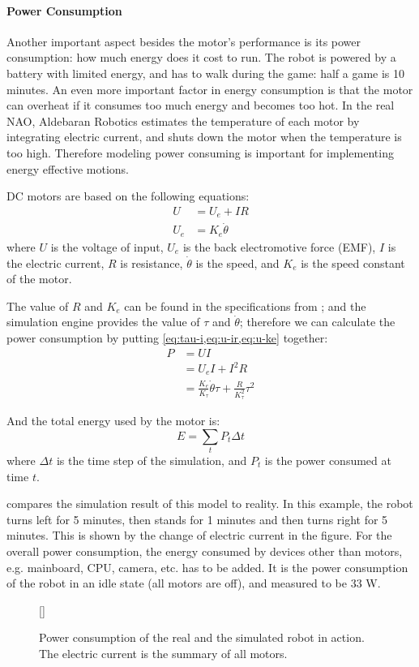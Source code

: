 \documentclass{llncs}
\newcommand{\inputtikz}[1]
{
  \StrSubstitute{#1}{/}{.}[\fn]
  \scancs{\filename}{\fn}
  \tikzsetfigurename{\filename}
  
}
\begin{document}
\paragraph{Power Consumption}
Another important aspect besides the motor's performance is its
power consumption: how much energy does it cost to run.
The robot is powered by a battery with limited energy, and has to walk during the
game: half a game is 10 minutes.
An even more important factor in energy consumption is
that the motor can overheat if it consumes too much energy and
becomes too hot. In the real NAO, Aldebaran Robotics estimates the temperature
of each motor by integrating electric current, and shuts down the motor
when the temperature is too high. Therefore modeling power consuming
is important for implementing energy effective motions.

DC motors are based on the following equations:
\begin{align}
  U &= U_e + IR \label{eq:u-ir}\\
  U_e &= K_e \dot{\theta} \label{eq:u-ke}
\end{align}
where $U$ is the voltage of input, $U_e$ is the back electromotive
force (EMF), $I$ is the electric current, $R$ is resistance,
$\dot{\theta}$ is the speed, and $K_e$ is the speed constant of the motor.

The value of $R$ and $K_e$ can be found in the specifications from \cite{naoqi};
and the simulation engine provides
the value of $\tau$ and $\dot{\theta}$; therefore we can calculate the
power consumption by putting \cref{eq:tau-i,eq:u-ir,eq:u-ke} together:
\begin{align}
  P &= UI \\
  &= U_eI + I^2R \\
  &= \frac{K_e}{K_\tau}\dot{\theta}\tau + \frac{R}{K_\tau^2}\tau^2
\end{align}

And the total energy used by the motor is:
\begin{equation}
  \label{eq:motor-power}
  E = \sum_t{P_t\Delta{}t}
\end{equation}
where $\Delta{}t$ is the time step of the simulation, and $P_t$ is the power consumed at time $t$. 

 compares the simulation result of this model to
reality. In this example, the robot turns left for 5 minutes, then
stands for 1 minutes and then turns right for 5 minutes. This is shown by the change of electric current in the figure. For the overall
power consumption, the energy consumed by devices other than motors,
e.g. mainboard, CPU, camera, etc. has to be added. It is the power
consumption of the robot in an idle state (all motors are off), and measured to be 33 W.
\begin{figure}
  \centering
  \inputtikz{battery}
  \caption{Power consumption of the real and the simulated robot in action.
    The electric current is the summary of all motors.}
  \label{fig:battery}
\end{figure}
\end{document}
